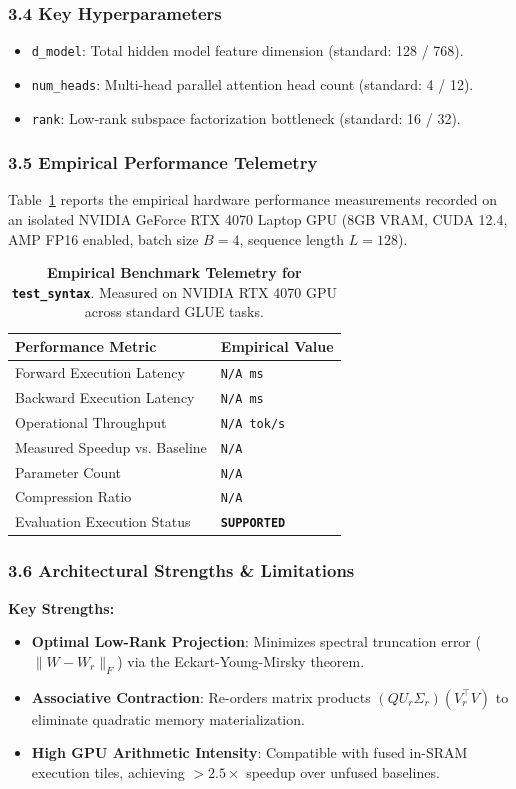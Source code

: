 \subsubsection*{3.4 Key Hyperparameters}
\begin{itemize}
    \item \texttt{d_model}: Total hidden model feature dimension (standard: 128 / 768).
    \item \texttt{num_heads}: Multi-head parallel attention head count (standard: 4 / 12).
    \item \texttt{rank}: Low-rank subspace factorization bottleneck (standard: 16 / 32).
\end{itemize}

\subsubsection*{3.5 Empirical Performance Telemetry}
Table~\ref{tab:telemetry_test\_syntax} reports the empirical hardware performance measurements recorded on an isolated NVIDIA GeForce RTX 4070 Laptop GPU (8GB VRAM, CUDA 12.4, AMP FP16 enabled, batch size $B=4$, sequence length $L=128$).

\begin{table}[h]
\centering
\small
\caption{\textbf{Empirical Benchmark Telemetry for \texttt{test\_syntax}}. Measured on NVIDIA RTX 4070 GPU across standard GLUE tasks.}
\label{tab:telemetry_test\_syntax}
\begin{tabularx}{\columnwidth}{lX}
\toprule
\textbf{Performance Metric} & \textbf{Empirical Value} \\
\midrule
Forward Execution Latency & \texttt{N/A ms} \\
Backward Execution Latency & \texttt{N/A ms} \\
Operational Throughput & \texttt{N/A tok/s} \\
Measured Speedup vs. Baseline & \texttt{N/A} \\
Parameter Count & \texttt{N/A} \\
Compression Ratio & \texttt{N/A} \\
Evaluation Execution Status & \textbf{\texttt{SUPPORTED}} \\
\bottomrule
\end{tabularx}
\end{table}

\subsubsection*{3.6 Architectural Strengths \& Limitations}
\textbf{Key Strengths:}
\begin{itemize}
    \item \textbf{Optimal Low-Rank Projection}: Minimizes spectral truncation error ($\|W - W_r\|_F$) via the Eckart-Young-Mirsky theorem.
    \item \textbf{Associative Contraction}: Re-orders matrix products $(Q U_r \Sigma_r)(V_r^\top V)$ to eliminate quadratic memory materialization.
    \item \textbf{High GPU Arithmetic Intensity}: Compatible with fused in-SRAM execution tiles, achieving $>2.5\times$ speedup over unfused baselines.
\end{itemize}

